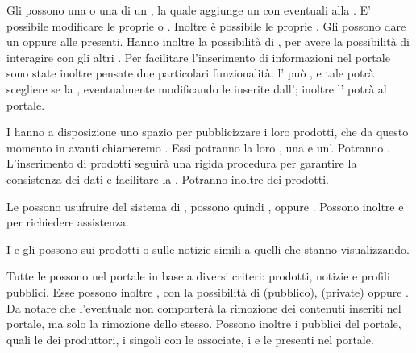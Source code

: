 Gli  possono  una  o una  di un , la quale aggiunge un  con eventuali  alla . E' possibile modificare le proprie  o . Inoltre è possibile  le proprie .
Gli  possono dare un   oppure  alle  presenti. Hanno inoltre la possibilità di , per avere la possibilità di interagire con gli altri .
Per facilitare l'inserimento di informazioni nel portale sono state inoltre pensate due particolari funzionalità: l' può , e tale  potrà scegliere se  la , eventualmente modificando le  inserite dall'; inoltre l' potrà  al portale.

I  hanno a disposizione uno spazio per pubblicizzare i loro prodotti, che da questo momento in avanti chiameremo . Essi potranno  la loro ,  una  e un'. Potranno . L'inserimento di prodotti seguirà una rigida procedura per garantire la consistenza dei dati e facilitare la . Potranno inoltre  dei prodotti.

\bigskip
Le  possono usufruire del sistema di , possono quindi ,  oppure . Possono inoltre  e   per richiedere assistenza.

I  e gli  possono  sui prodotti o sulle notizie simili a quelli che stanno visualizzando. 

Tutte le  possono  nel portale in base a diversi criteri: prodotti, notizie e profili pubblici.
Esse possono inoltre , con la possibilità di  (pubblico),  (private) oppure . Da notare che l'eventuale  non comporterà la rimozione dei contenuti inseriti nel portale, ma solo la rimozione dello stesso. Possono inoltre  i  pubblici del portale, quali le  dei produttori, i singoli  con le  associate, i  e le  presenti nel portale.

